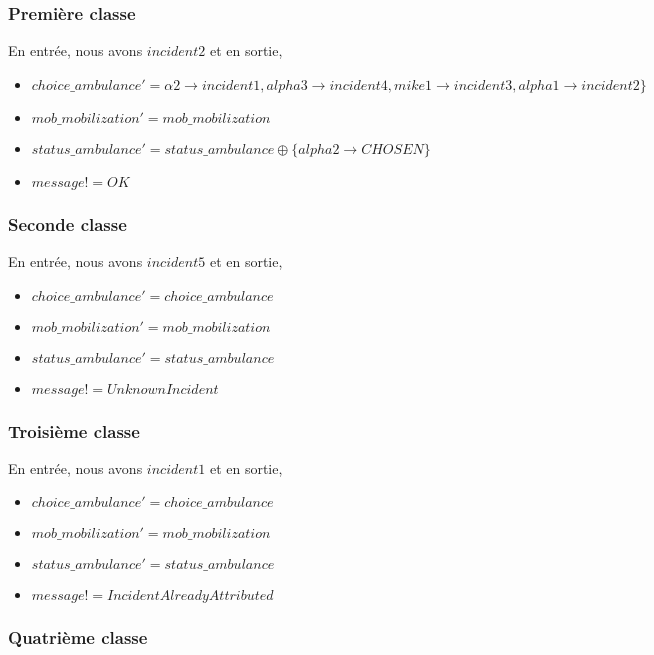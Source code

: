 \documentclass{report}
\begin{document}
\subsubsection{Première classe}

En entrée, nous avons $incident2$ et en sortie, 
\begin{itemize}
	\item $choice\_ambulance' = \alpha2 \rightarrow incident1, alpha3 \rightarrow incident4, mike1 \rightarrow incident3, alpha1 \rightarrow incident2 \}$
	\item $mob\_mobilization' = mob\_mobilization$
	\item $status\_ambulance' = status\_ambulance \oplus \{alpha2 \rightarrow CHOSEN \}$
	\item $message! = OK$
\end{itemize}

\subsubsection{Seconde classe}

En entrée, nous avons $incident5$ et en sortie, 
\begin{itemize}
	\item $choice\_ambulance' = choice\_ambulance$
	\item $mob\_mobilization' = mob\_mobilization$
	\item $status\_ambulance' = status\_ambulance$
	\item $message! = UnknownIncident$
\end{itemize}

\subsubsection{Troisième classe}

En entrée, nous avons $incident1$ et en sortie, 
\begin{itemize}
	\item $choice\_ambulance' = choice\_ambulance$
	\item $mob\_mobilization' = mob\_mobilization$
	\item $status\_ambulance' = status\_ambulance$
	\item $message! = IncidentAlreadyAttributed$
\end{itemize}

\subsubsection{Quatrième classe}
\end{document}
